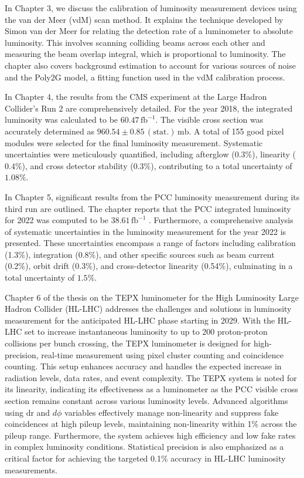 In Chapter 3, we discuss the calibration of luminosity measurement devices using the van der Meer (vdM) scan method. It explains the technique developed by Simon van der Meer for relating the detection rate of a luminometer to absolute luminosity. This involves scanning colliding beams across each other and measuring the beam overlap integral, which is proportional to luminosity. The chapter also covers background estimation to account for various sources of noise and the Poly2G model, a fitting function used in the vdM calibration process.

In Chapter 4, the results from the CMS experiment at the Large Hadron Collider's Run 2 are comprehensively detailed. For the year 2018, the integrated luminosity was calculated to be \(60.47 \, \text{fb}^{-1}\). The visible cross section was accurately determined as \(960.54 \pm 0.85 \, (\text{stat.}) \, \text{mb}\). A total of 155 good pixel modules were selected for the final luminosity measurement. Systematic uncertainties were meticulously quantified, including afterglow (\(0.3\%\)), linearity (\(0.4\%\)), and cross detector stability (\(0.3\%\)), contributing to a total uncertainty of \(1.08\%\). 

In Chapter 5, significant results from the PCC luminosity measurement during its third run are outlined. The chapter reports that the PCC integrated luminosity for 2022 was computed to be \(38.61 \, \text{fb}^{-1}\) . Furthermore, a comprehensive analysis of systematic uncertainties in the luminosity measurement for the year 2022 is presented. These uncertainties encompass a range of factors including calibration (1.3\%), integration (0.8\%), and other specific sources such as beam current (0.2\%), orbit drift (0.3\%), and cross-detector linearity (0.54\%), culminating in a total uncertainty of \(1.5\%\). 

Chapter 6 of the thesis on the TEPX luminometer for the High Luminosity Large Hadron Collider (HL-LHC) addresses the challenges and solutions in luminosity measurement for the anticipated HL-LHC phase starting in 2029. With the HL-LHC set to increase instantaneous luminosity to up to 200 proton-proton collisions per bunch crossing, the TEPX luminometer is designed for high-precision, real-time measurement using pixel cluster counting and coincidence counting. This setup enhances accuracy and handles the expected increase in radiation levels, data rates, and event complexity. The TEPX system is noted for its linearity, indicating its effectiveness as a luminometer as the PCC visible cross section remains constant across various luminosity levels. Advanced algorithms using dr and $d\phi$ variables effectively manage non-linearity and suppress fake coincidences at high pileup levels, maintaining non-linearity within 1\% across the pileup range. Furthermore, the system achieves high efficiency and low fake rates in complex luminosity conditions. Statistical precision is also emphasized as a critical factor for achieving the targeted 0.1\% accuracy in HL-LHC luminosity measurements.


